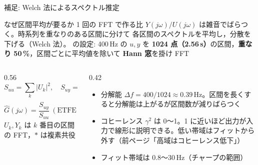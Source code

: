 \begin{frame}{補足: Welch 法によるスペクトル推定\later}
  \begin{block}{なぜ区間平均が要るか}
    \scriptsize 1 回の FFT で作る比 $Y(j\omega)/U(j\omega)$ は雑音でばらつく。時系列を重なりのある区間に分けて
    各区間のスペクトルを平均し，分散を下げる（Welch 法）。 の設定: 400\,Hz の $u,y$ を
    \textbf{1024 点（2.56\,s）}の区間，\textbf{重なり 50\,\%}，区間ごとに平均値を除いて \textbf{Hann 窓}を掛け FFT
  \end{block}

  \begin{columns}[T]
    \begin{column}{0.56\textwidth}
      \footnotesize
      \setlength{\abovedisplayskip}{2pt}\setlength{\belowdisplayskip}{2pt}%
      \[
        S_{uu}=\sum_k |U_k|^2,\quad S_{uy}=\sum_k Y_k U_k^{*},\quad S_{yy}=\sum_k |Y_k|^2
      \]
      \[
        \hat G(j\omega)=\frac{S_{uy}}{S_{uu}}\ (\text{ETFE}),\qquad
        \gamma^2(\omega)=\frac{|S_{uy}|^2}{S_{uu}\,S_{yy}}\ (\text{コヒーレンス})
      \]
      {\scriptsize $U_k, Y_k$ は $k$ 番目の区間の FFT，$*$ は複素共役}
    \end{column}
    \begin{column}{0.42\textwidth}
      \scriptsize
      \begin{itemize}\setlength{\itemsep}{1pt}
        \item 分解能 $\Delta f = 400/1024 \approx 0.39$\,Hz。区間を長くすると分解能は上がるが区間数が減りばらつく
        \item コヒーレンス $\gamma^2$ は 0〜1。1 に近いほど出力が入力で線形に説明できる。低い帯域はフィットから外す（前ページ「高域はコヒーレンス低下」）
        \item フィット帯域は 0.8〜30\,Hz（チャープの範囲）
      \end{itemize}
    \end{column}
  \end{columns}
\end{frame}

